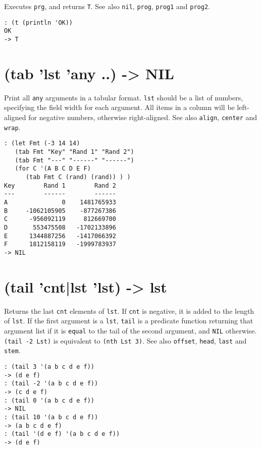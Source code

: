 {{{{{{{{Executes \texttt{prg}, and returns \texttt{T}. See also \texttt{nil}, \texttt{prog}, \texttt{prog1} and
\texttt{prog2}.


\begin{verbatim}
: (t (println 'OK))
OK
-> T
\end{verbatim}

 
\section{(tab 'lst 'any ..) -> NIL}
\label{sec-8-1-20-7}


Print all \texttt{any} arguments in a tabular format. \texttt{lst} should be a list of
numbers, specifying the field width for each argument. All items in a
column will be left-aligned for negative numbers, otherwise
right-aligned. See also \texttt{align}, \texttt{center} and \texttt{wrap}.


\begin{verbatim}
: (let Fmt (-3 14 14)
   (tab Fmt "Key" "Rand 1" "Rand 2")
   (tab Fmt "---" "------" "------")
   (for C '(A B C D E F)
      (tab Fmt C (rand) (rand)) ) )
Key        Rand 1        Rand 2
---        ------        ------
A               0    1481765933
B     -1062105905    -877267386
C      -956092119     812669700
D       553475508   -1702133896
E      1344887256   -1417066392
F      1812158119   -1999783937
-> NIL
\end{verbatim}

 
\section{(tail 'cnt|lst 'lst) -> lst}
\label{sec-8-1-20-8}


Returns the last \texttt{cnt} elements of \texttt{lst}. If \texttt{cnt} is negative, it is
added to the length of \texttt{lst}. If the first argument is a \texttt{lst}, \texttt{tail}
is a predicate function returning that argument list if it is \texttt{equal} to
the tail of the second argument, and \texttt{NIL} otherwise. \texttt{(tail -2 Lst)} is
equivalent to \texttt{(nth Lst 3)}. See also \texttt{offset}, \texttt{head}, \texttt{last} and
\texttt{stem}.


\begin{verbatim}
: (tail 3 '(a b c d e f))
-> (d e f)
: (tail -2 '(a b c d e f))
-> (c d e f)
: (tail 0 '(a b c d e f))
-> NIL
: (tail 10 '(a b c d e f))
-> (a b c d e f)
: (tail '(d e f) '(a b c d e f))
-> (d e f)
\end{verbatim}

}}}}}}}}
